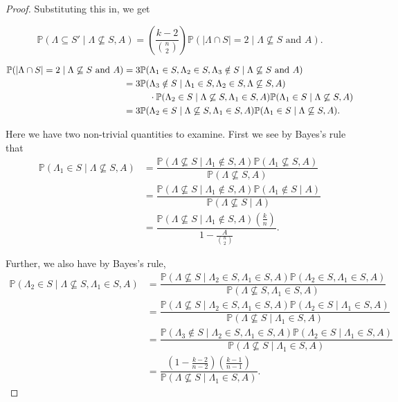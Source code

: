 \documentclass[12pt]{article} %
\newcommand{\p}[1]{\left(#1\right)}
\newcommand{\abs}[1]{\left\lvert#1\right\rvert}
\renewcommand{\P}{\mathbb{P}}
\theoremstyle{definition}
\theoremstyle{definition}
\begin{document}
\begin{proof}
Substituting this in, we get

\[\P(\Lambda \subseteq S' \mid \Lambda \not \subseteq S, A) = \p{\frac{k-2}{{n\choose2}}}\P(\abs{\Lambda \cap S} = 2 \mid \Lambda \not \subseteq S\text{ and } A).\]

\begin{align*}
\P(\abs{\Lambda \cap S} = 2 \mid \Lambda \not \subseteq S\text{ and } A) 
&= 3\P(\Lambda_1 \in S, \Lambda_2 \in S, \Lambda_3 \notin S \mid \Lambda \not \subseteq S \textrm{ and } A) \\
&= 3\P(\Lambda_3 \notin S \mid \Lambda_1 \in S, \Lambda_2 \in S, \Lambda \not \subseteq S, A) \\
&\hspace{10mm} \cdot \P(\Lambda_2 \in S \mid \Lambda \not \subseteq S, \Lambda_1 \in S, A)\P(\Lambda_1 \in S \mid \Lambda \not \subseteq S, A) \\
&= 3\P(\Lambda_2 \in S \mid \Lambda \not \subseteq S, \Lambda_1 \in S, A)\P(\Lambda_1 \in S \mid \Lambda \not \subseteq S, A).
\end{align*}

Here we have two non-trivial quantities to examine. First we see by Bayes's rule that 
\begin{align*}
\P(\Lambda_1 \in S \mid \Lambda \not \subseteq S, A) &= \dfrac{\P(\Lambda \not \subseteq S \mid \Lambda_1 \notin S, A)\P(\Lambda_1 \not \subseteq S,A)}{\P(\Lambda \not \subseteq S, A)} \\
&= \dfrac{\P(\Lambda \not \subseteq S \mid \Lambda_1 \notin S, A)\P(\Lambda_1 \notin S \mid A)}{\P(\Lambda \not \subseteq S \mid A)} \\
&= \dfrac{\P(\Lambda \not \subseteq S \mid \Lambda_1 \notin S, A)\p{\frac{k}{n}}}{1-\frac{A}{\binom{n}{2}}}.
\end{align*}

Further, we also have by Bayes's rule,
\begin{align*}
\P(\Lambda_2 \in S \mid \Lambda \not \subseteq S, \Lambda_1 \in S, A) &= \dfrac{\P(\Lambda \not \subseteq S \mid \Lambda_2 \in S, \Lambda_1 \in S, A)\P(\Lambda_2 \in S, \Lambda_1 \in S, A)}{\P(\Lambda \not \subseteq S, \Lambda_1 \in S, A)} \\
&= \dfrac{\P(\Lambda \not \subseteq S \mid \Lambda_2 \in S, \Lambda_1 \in S, A)\P(\Lambda_2 \in S \mid \Lambda_1 \in S, A)}{\P(\Lambda \not \subseteq S \mid \Lambda_1 \in S, A)} \\
&= \dfrac{\P(\Lambda_3 \notin S \mid \Lambda_2 \in S, \Lambda_1 \in S, A)\P(\Lambda_2 \in S \mid \Lambda_1 \in S, A)}{\P(\Lambda \not \subseteq S \mid \Lambda_1 \in S, A)} \\
&= \dfrac{\p{1-\frac{k-2}{n-2}}\p{\frac{k-1}{n-1}}}{\P(\Lambda \not \subseteq S \mid \Lambda_1 \in S, A)}.
\end{align*}


\end{proof}
\end{document}
